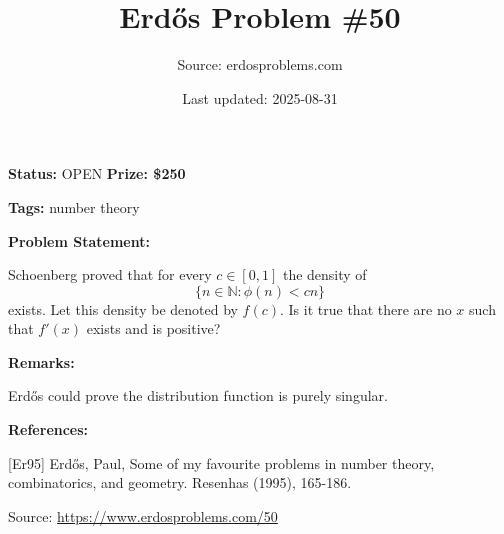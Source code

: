 \documentclass{article}
\title{Erd\H{o}s Problem \#50}
\date{Last updated: 2025-08-31}
\author{Source: erdosproblems.com}
\begin{document}
\maketitle

\noindent\textbf{Status:} OPEN \quad \textbf{Prize: \$250}

\noindent\textbf{Tags:} number theory

\medskip
\noindent\textbf{Problem Statement:}

Schoenberg proved that for every $c\in [0,1]$ the density of\[\{ n\in \mathbb{N} : \phi(n)<cn\}\]exists. Let this density be denoted by $f(c)$. Is it true that there are no $x$ such that $f'(x)$ exists and is positive?

\bigskip
\noindent\textbf{Remarks:}

Erd\H{o}s \cite{Er95} could prove the distribution function is purely singular.

\bigskip
\noindent\textbf{References:}

[Er95] Erd\H{o}s, Paul, Some of my favourite problems in number theory, combinatorics, and geometry. Resenhas (1995), 165-186.

\bigskip
\noindent\small{Source: \url{https://www.erdosproblems.com/50}}
\end{document}
